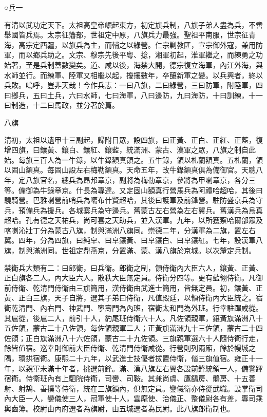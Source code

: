 
\begin{pinyinscope}
○兵一

有清以武功定天下。太祖高皇帝崛起東方，初定旗兵制，八旗子弟人盡為兵，不啻舉國皆兵焉。太宗征籓部，世祖定中原，八旗兵力最強。聖祖平南服，世宗征青海，高宗定西疆，以旗兵為主，而輔之以綠營。仁宗剿教匪，宣宗御外寇，兼用防軍，而以鄉兵助之。文宗、穆宗先後平粵、捻，湘軍初起，淮軍繼之，而練勇之功始著，至是兵制蓋數變矣。道、咸以後，海禁大開，德宗復立海軍，內江外海，與水師並行。而練軍、陸軍又相繼以起，擾攘數年，卒釀新軍之變。以兵興者，終以兵敗。嗚呼，豈非天哉！今作兵志：一曰八旗，二曰綠營，三曰防軍，附陸軍，四曰鄉兵，五曰土兵，六曰水師，七曰海軍，八曰邊防，九曰海防，十曰訓練，十一曰制造，十二曰馬政，並分著於篇。

八旗

清初，太祖以遺甲十三副起，歸附日眾，設四旗，曰正黃、正白、正紅、正藍，復增四旗，曰鑲黃、鑲白、鑲紅、鑲藍，統滿洲、蒙古、漢軍之眾，八旗之制自此始。每旗三百人為一牛錄，以牛錄額真領之。五牛錄，領以札蘭額真。五札蘭，領以固山額真。每固山設左右梅勒額真。天命五年，改牛錄額真俱為備御官。天聰八年，定八旗官名，總兵為昂邦章京，副將為梅勒章京，參將為甲喇章京，各分三等。備御為牛錄章京。什長為專達。又定固山額真行營馬兵為阿禮哈超哈，其後曰驍騎營。巴雅喇營前哨兵為噶布什賢超哈，其後曰護軍及前鋒營。駐防盛京兵為守兵，預備兵為援兵。各城寨兵為守邊兵。舊蒙古左右營為左右翼兵。舊漢兵為烏真超哈。孔有德之天祐兵，尚可喜之天助兵，並入漢軍。九年，以所獲察哈爾部眾及喀喇沁壯丁分為蒙古八旗，制與滿洲八旗同。崇德二年，分漢軍為二旗，置左右翼。四年，分為四旗，曰純皁、曰皁鑲黃、曰皁鑲白、曰皁鑲紅。七年，設漢軍八旗，制與滿洲同。世祖定鼎燕京，分置滿、蒙、漢八旗於京城。以次釐定兵制。

禁衛兵大類有二：曰郎衛，曰兵衛。郎衛之制，領侍衛內大臣六人，鑲黃、正黃、正白旗各二人。內大臣六人。散秩大臣無定員。侍衛分四等。更有藍翎侍衛。凡御前侍衛、乾清門侍衛由三旗簡用，漢侍衛由武進士簡用，皆無定員。初，鑲黃、正黃、正白三旗，天子自將，選其子弟曰侍衛，凡值殿廷，以領侍衛內大臣統之。宿衛乾清門、內右門、神武門、寧壽門為內班，宿衛太和門為外班。行幸駐蹕咸從。其扈從，後扈二人，前引十人，豹尾班侍衛六十人。凡佐領親軍，鑲黃旗滿洲八十五佐領，蒙古二十八佐領，每佐領親軍二人；正黃旗滿洲九十三佐領，蒙古二十四佐領；正白旗滿洲八十六佐領，蒙古二十九佐領。三旗親軍選六十人隨侍衛行走，餘皆值宿。巡幸則御前大臣侍衛、乾清門侍衛咸從。行營則列兩廂，餘於幔城之隅，環拱宿衛。康熙二十九年，以武進士技優者拔置侍衛，偕三旗值宿。雍正十一年，以親軍未滿十年者，挑選前鋒。滿、漢八旗左右翼各設前鋒統領一人，備警蹕宿衛。侍衛班內有上駟院侍衛，司轡、司鞍。其兼尚虞、鷹鷂房、鶻房、十五善射、射鵠、善撲等侍衛，統在三旗額內，俱無定員。鑾儀衛亦侍從武職。設掌衛司內大臣一人，鑾儀使三人，冠軍使十人，雲麾使、治儀正、整儀尉各有差，專司乘輿鹵簿。校尉由內府選者為旗尉，由五城選者為民尉。此八旗郎衛制也。


\end{pinyinscope}
